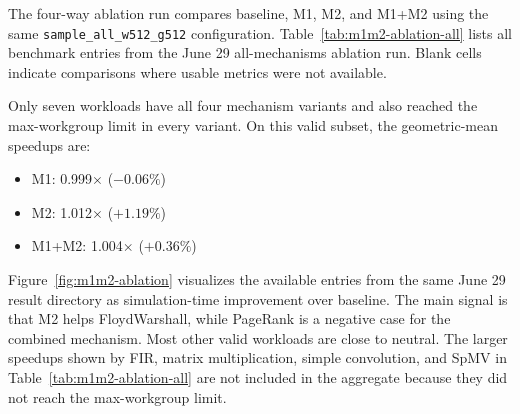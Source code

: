 \documentclass[sigconf,screen,review]{acmart}
\begin{document}
The four-way ablation run compares baseline, M1, M2, and M1+M2 using the same
\texttt{sample\_all\_w512\_g512} configuration.  Table~\ref{tab:m1m2-ablation-all}
lists all benchmark entries from the June 29 all-mechanisms ablation run.
Blank cells indicate comparisons where usable metrics were not available.

Only seven workloads have all four mechanism variants and also reached the
max-workgroup limit in every variant.  On this valid subset, the geometric-mean
speedups are:

\begin{itemize}
  \item M1: 0.999$\times$ ($-0.06\%$)
  \item M2: 1.012$\times$ ($+1.19\%$)
  \item M1+M2: 1.004$\times$ ($+0.36\%$)
\end{itemize}

Figure~\ref{fig:m1m2-ablation} visualizes the available entries from the same
June 29 result directory as simulation-time improvement over baseline.  The main
signal is that M2 helps FloydWarshall, while PageRank is a negative case for
the combined mechanism.  Most other valid workloads are close to neutral.  The
larger speedups shown by FIR, matrix multiplication, simple convolution, and
SpMV in Table~\ref{tab:m1m2-ablation-all} are not included in the aggregate
because they did not reach the max-workgroup limit.
\end{document}
